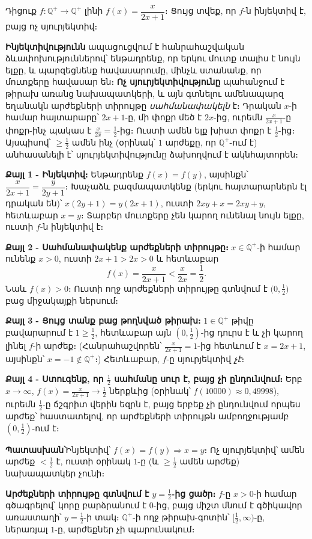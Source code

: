 \documentclass[11pt,a4paper]{article}
\newcommand{\Q}{\mathbb{Q}}
\newcommand{\answer}[1]{\begin{answerbox}\centering\textbf{Պատասխան՝}\quad #1\end{answerbox}}
\begin{document}
\begin{problembox}[12]
Դիցուք $f:\Q^+\to\Q^+$ լինի $f(x)=\dfrac{x}{2x+1}$։ Ցույց տվեք, որ $f$-ն ինյեկտիվ է, բայց ոչ սյուրյեկտիվ։
\end{problembox}

\begin{ideabox}
\textbf{Ինյեկտիվությունն} ապացուցվում է հանրահաշվական ձևափոխություններով՝ ենթադրենք, որ երկու մուտք տալիս է նույն ելքը, և
պարզեցնենք հավասարումը, մինչև ստանանք, որ մուտքերը հավասար են։ \textbf{Ոչ սյուրյեկտիվությունը} պահանջում
է թիրախ առանց նախապատկերի, և այն գտնելու ամենապարզ եղանակն արժեքների տիրույթը \emph{սահմանափակելն} է։
Դրական $x$-ի համար հայտարարը՝ $2x+1$-ը, մի փոքր մեծ է $2x$-ից, ուրեմն $\tfrac{x}{2x+1}$-ը փոքր-ինչ
պակաս է $\tfrac{x}{2x}=\tfrac12$-ից։ Ուստի ամեն ելք խիստ փոքր է $\tfrac12$-ից։ Այսպիսով՝ $\ge\tfrac12$ ամեն
ինչ (օրինակ՝ $1$ արժեքը, որ $\Q^+$-ում է) անհասանելի է՝ սյուրյեկտիվությունը ձախողվում է ակնհայտորեն։
\end{ideabox}

\textbf{Քայլ 1 - Ինյեկտիվ։} Ենթադրենք $f(x)=f(y)$, այսինքն՝ $\dfrac{x}{2x+1}=\dfrac{y}{2y+1}$։
Խաչաձև բազմապատկենք (երկու հայտարարներն էլ դրական են)՝ $x(2y+1)=y(2x+1)$, ուստի $2xy+x=2xy+y$, հետևաբար
$x=y$։ Տարբեր մուտքերը չեն կարող ունենալ նույն ելքը, ուստի $f$-ն ինյեկտիվ է։

\textbf{Քայլ 2 - Սահմանափակենք արժեքների տիրույթը։} $x\in\Q^+$-ի համար ունենք $x>0$, ուստի $2x+1>2x>0$ և
հետևաբար
\[
f(x)=\frac{x}{2x+1}<\frac{x}{2x}=\frac12.
\]
Նաև $f(x)>0$։ Ուստի ողջ արժեքների տիրույթը գտնվում է $\bigl(0,\tfrac12\bigr)$ բաց միջակայքի ներսում։

\textbf{Քայլ 3 - Ցույց տանք բաց թողնված թիրախ։} $1\in\Q^+$ թիվը բավարարում է $1\ge\tfrac12$, հետևաբար այն
$(0,\tfrac12)$-ից դուրս է և չի կարող լինել $f$-ի արժեք։ (Հանրահաշվորեն՝ $\tfrac{x}{2x+1}=1$-ից հետևում է
$x=2x+1$, այսինքն՝ $x=-1\notin\Q^+$։) Հետևաբար, $f$-ը սյուրյեկտիվ \emph{չէ}։

\textbf{Քայլ 4 - Ստուգենք, որ $\tfrac12$ սահմանը սուր է, բայց չի ընդունվում։} Երբ $x\to\infty$,
$f(x)=\tfrac{x}{2x+1}\to\tfrac12$ ներքևից (օրինակ՝ $f(10000)\approx0{,}49998$), ուրեմն $\tfrac12$-ը
ճշգրիտ վերին եզրն է, բայց երբեք չի ընդունվում որպես արժեք՝ հաստատելով, որ արժեքների տիրույթն
ամբողջությամբ $(0,\tfrac12)$-ում է։

\answer{Ինյեկտիվ՝ $f(x)=f(y)\Rightarrow x=y$։ Ոչ սյուրյեկտիվ՝ ամեն արժեք $<\tfrac12$ է, ուստի օրինակ
$1$-ը (և $\ge\tfrac12$ ամեն արժեք) նախապատկեր չունի։}

\medskip
\textbf{Արժեքների տիրույթը գտնվում է $y=\tfrac12$-ից ցածր։} $f$-ը $x>0$-ի համար գծագրելով՝ կորը բարձրանում է
$0$-ից, բայց միշտ մնում է գծիկավոր առաստաղի՝ $y=\tfrac12$-ի տակ։ $\Q^+$-ի ողջ թիրախ-գոտին՝
$\bigl[\tfrac12,\infty\bigr)$-ը, ներառյալ $1$-ը, արժեքներ չի պարունակում։
\end{document}

